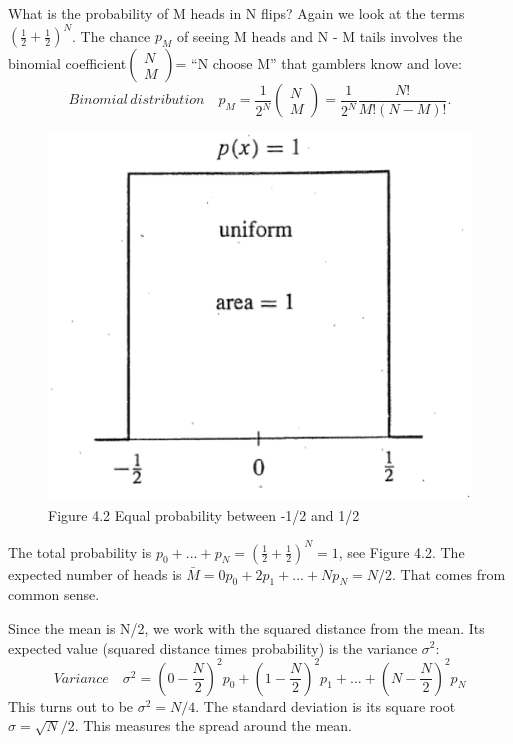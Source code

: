 	What is the probability of M heads in N flips? Again we look at the terms $(\frac{1}{2}+\frac{1}{2})^{N}$. The chance $p_M$ of seeing M heads and N - M tails involves the binomial coefficient$\begin{pmatrix} N \\ M \end{pmatrix}$= “N choose M” that gamblers know and love:
	\begin{equation*}
	Binomial\, distribution \quad 
	p_M = \frac{1}{2^N}
	\begin{pmatrix}
	N \\ M
	\end{pmatrix}
	=\frac{1}{2^N}\frac{N!}{M!(N-M)!}.
	\end{equation*}
	
	\begin{figure}[h]
		\centering
		\includegraphics[width=0.7\linewidth]{TeX_files/Part02/chapter04/image/4-2}
		\caption{Figure 4.2 Equal probability between -1/2 and 1/2}
		\label{fig:4-2}
	\end{figure}
	
	The total probability is $p_0+...+p_N=(\frac{1}{2}+\frac{1}{2})^N=1$, see Figure 4.2. The expected
	number of heads is $\bar{M}=0p_0+2p_1+...+Np_N=N/2$. That comes from common sense.
	
	Since the mean is N/2, we work with the squared distance from the mean. Its expected value (squared distance times probability) is the variance $\sigma^2$:
	\begin{equation*}
    Variance \quad 
	\sigma^2=(0-\frac{N}{2})^2p_0 + (1-\frac{N}{2})^2p_1 + ...+ (N-\frac{N}{2})^2p_N
	\end{equation*}
	This turns out to be $\sigma^2=N/4$. The standard deviation is its square root $\sigma=\sqrt{N}/2$.
	This measures the spread around the mean.
	
